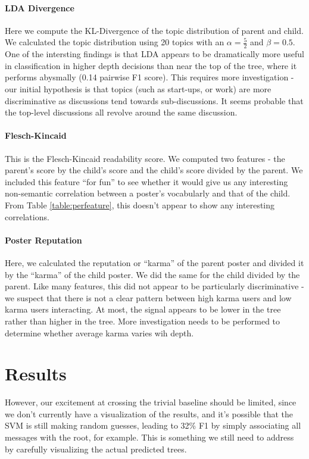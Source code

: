 \documentclass[10pt]{article}
\begin{document}
\paragraph{LDA Divergence} Here we compute the KL-Divergence of the topic distribution
of parent and child. We calculated the topic distribution using 20 topics with
an $\alpha=\frac{5}{2}$ and $\beta = 0.5$. One of the intersting findings is
that LDA appears to be dramatically more useful in classification in higher
depth decisions than near the top of the tree, where it performs abysmally (0.14
pairwise F1 score). This requires more investigation - our initial hypothesis is
that topics (such as start-ups, or work) are more discriminative as discussions
tend towards sub-discussions. It seems probable that the top-level discussions
all revolve around the same discussion.

\paragraph{Flesch-Kincaid} This is the Flesch-Kincaid readability score. We computed
two features - the parent's score by the child's score and the child's score divided
by the parent. We included this feature ``for fun'' to see whether it would give
us any interesting non-semantic correlation between a poster's vocabularly and
that of the child. From Table \ref{table:perfeature}, this doesn't appear to
show any interesting correlations.

\paragraph{Poster Reputation} Here, we calculated the reputation or ``karma'' of the
parent poster and divided it by the ``karma'' of the child poster. We did the same
for the child divided by the parent. Like many features, this did not appear to
be particularly discriminative - we suspect that there is not a clear pattern
between high karma users and low karma users interacting. At most, the signal
appears to be lower in the tree rather than higher in the tree. More
investigation needs to be performed to determine whether average karma varies
wih depth.


\section{Results}
\label{sec:results}
However, our excitement at crossing the trivial baseline should be limited,
since we don't currently have a visualization of the results, and it's
possible that the SVM is still making random guesses, leading to 32\% F1 by
simply associating all messages with the root, for example. This is something
we still need to address by carefully visualizing the actual predicted trees.
\end{document}

